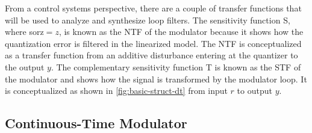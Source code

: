 From a control systems perspective, there are a couple of transfer functions that will be used to analyze and synthesize loop filters. The sensitivity function \gls{S}, where \gls{sorz}$=z$, is known as the \gls{NTF} of the modulator because it shows how the quantization error is filtered in the linearized model. The \gls{NTF} is conceptualized as a transfer function from an additive disturbance entering at the quantizer to the output $y$. The complementary sensitivity function \gls{T} is known as the \gls{STF} of the modulator and shows how the signal is transformed by the modulator loop. It is conceptualized as shown in \autoref{fig:basic-struct-dt} from input $r$ to output $y$.

\subsection{Continuous-Time Modulator}
\label{sec:in-ctm}


